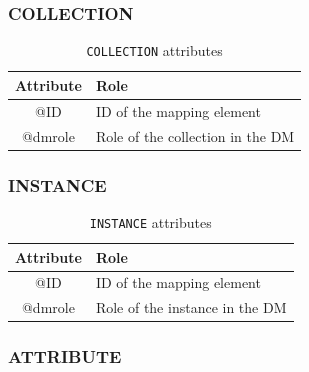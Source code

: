 \documentclass[11pt,a4paper]{ivoa}
\begin{document}
\FloatBarrier

\subsubsection{COLLECTION}

\begin{table}[!htbp]
\small
\centering
\begin{tabulary}{\linewidth}{|c|J|}       
       \hline 
            \textbf{Attribute} & 
            \textbf {Role}\\
       \hline         \hline  
            @ID & 
            ID of the mapping element  \\
        \hline 
            @dmrole & 
            Role of the collection in the DM \\
        \hline 
     \end{tabulary}
     \caption{\texttt{COLLECTION} attributes} 
     \label{tbl:collection-att}
 \end{table}
 
\FloatBarrier

\subsubsection{INSTANCE}

\begin{table}[!htbp]
\small
\centering
\begin{tabulary}{\linewidth}{|c|J|}       
       \hline 
            \textbf{Attribute} & 
            \textbf {Role}\\
       \hline         \hline  
            @ID & 
            ID of the mapping element  \\
        \hline 
            @dmrole & 
            Role of the instance in the DM \\
        \hline 
     \end{tabulary}
     \caption{\texttt{INSTANCE} attributes} 
     \label{tbl:instance-att}
 \end{table}


\FloatBarrier

\subsubsection{ATTRIBUTE}
\end{document}
